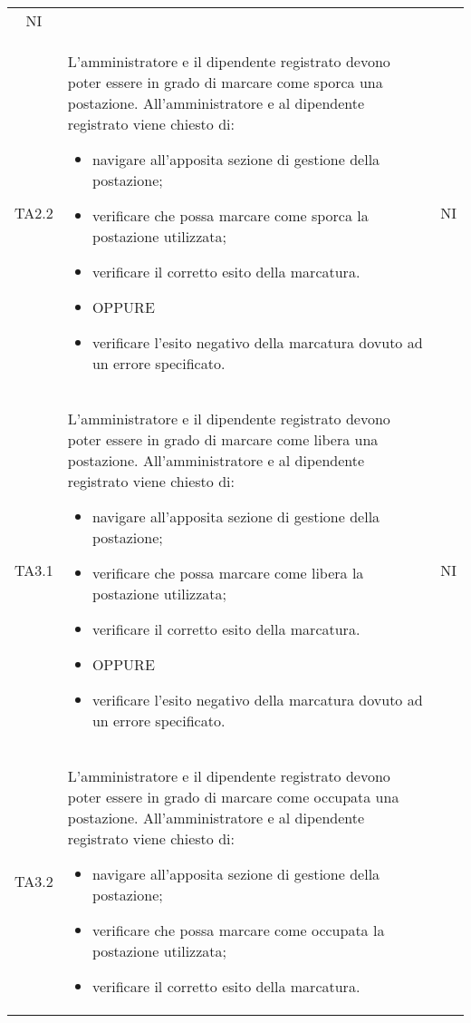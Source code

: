 {\begin{longtable}{ c C{11cm} c }
        NI\\
        TA2.2&
        L'amministratore e il dipendente registrato devono poter essere in grado di marcare come sporca una postazione.\newline
        All'amministratore e al dipendente registrato viene chiesto di:
        \begin{itemize}
            \item navigare all'apposita sezione di gestione della postazione;
            \item verificare che possa marcare come sporca la postazione utilizzata;
            \item verificare il corretto esito della marcatura.
            \item [] OPPURE
            \item verificare l'esito negativo della marcatura dovuto ad un errore specificato.
        \end{itemize}&
        NI\\
        TA3.1&
        L'amministratore e il dipendente registrato devono poter essere in grado di marcare come libera una postazione.\newline
        All'amministratore e al dipendente registrato viene chiesto di:
        \begin{itemize}
            \item navigare all'apposita sezione di gestione della postazione;
            \item verificare che possa marcare come libera la postazione utilizzata;
            \item verificare il corretto esito della marcatura.
            \item [] OPPURE
            \item verificare l'esito negativo della marcatura dovuto ad un errore specificato.
        \end{itemize}&
        NI\\
        TA3.2&
        L'amministratore e il dipendente registrato devono poter essere in grado di marcare come occupata una postazione.\newline
        All'amministratore e al dipendente registrato viene chiesto di:
        \begin{itemize}
            \item navigare all'apposita sezione di gestione della postazione;
            \item verificare che possa marcare come occupata la postazione utilizzata;
            \item verificare il corretto esito della marcatura.

\end{itemize}
\end{longtable}}
